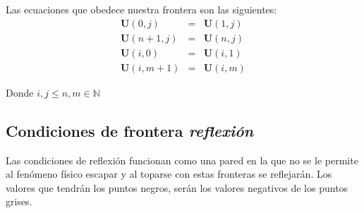 \documentclass[12pt,a4paper]{book}
\begin{document}
Las ecuaciones que obedece nuestra frontera son las siguientes:
\begin{eqnarray}
\textbf{U}(0,j)&=&\textbf{U}(1,j) \\
\textbf{U}(n+1,j)&=&\textbf{U}(n,j) \\
\textbf{U}(i,0)&=&\textbf{U}(i,1) \\
\textbf{U}(i,m+1)&=&\textbf{U}(i,m) 
\end{eqnarray}

Donde $i,j \leq n,m \in \mathbb{N}$

\subsection{Condiciones de frontera \emph{reflexión}}
Las condiciones de reflexión funcionan como una pared en la que no se le permite al fenómeno físico escapar y al toparse con estas fronteras se reflejarán. Los valores que tendrán los puntos negros, serán los 
valores negativos de los puntos grises.
\end{document}
